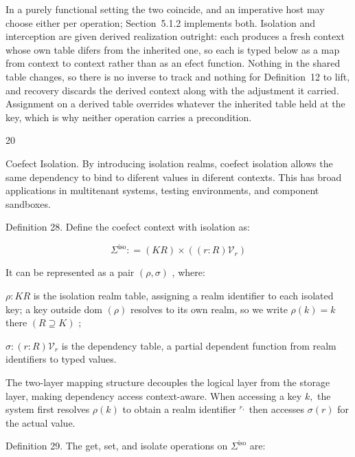 \documentclass[
  10
]{article}
\begin{document}
In a purely functional setting the two coincide, and an imperative host
may choose either per operation; Section~5.1.2 implements both.
Isolation and interception are given derived realization outright: each
produces a fresh context whose own table difers from the inherited one,
so each is typed below as a map from context to context rather than as
an efect function. Nothing in the shared table changes, so there is no
inverse to track and nothing for Definition~12 to lift, and recovery
discards the derived context along with the adjustment it carried.
Assignment on a derived table overrides whatever the inherited table
held at the key, which is why neither operation carries a precondition.

20

Coefect Isolation. By introducing isolation realms, coefect isolation
allows the same dependency to bind to diferent values in diferent
contexts. This has broad applications in multitenant systems, testing
environments, and component sandboxes.

Definition 28. Define the coefect context with isolation as:

\[
\Sigma ^ { \mathrm { i s o } } : = ( K  R ) \times ( ( r : R )  \mathcal { V } _ { r } )\tag{27}
\]

It can be represented as a pair \(( \rho , \sigma )\) , where:

\(\rho : K  R\) is the isolation realm table, assigning a realm
identifier to each isolated key; a key outside dom \(( \rho )\) resolves
to its own realm, so we write \(\rho ( k ) = k\) there
\(( R \supseteq K )\) ;

\(\sigma : ( r : R )  \mathcal { V } _ { r }\) is the dependency table,
a partial dependent function from realm identifiers to typed values.

The two-layer mapping structure decouples the logical layer from the
storage layer, making dependency access context-aware. When accessing a
key \(k ,\) the system first resolves \(\rho ( k )\) to obtain a realm
identifier \(^ { r , }\) then accesses \(\sigma ( r )\) for the actual
value.

Definition 29. The get, set, and isolate operations on
\(\Sigma ^ { \mathrm { i s o } }\) are:
\end{document}
